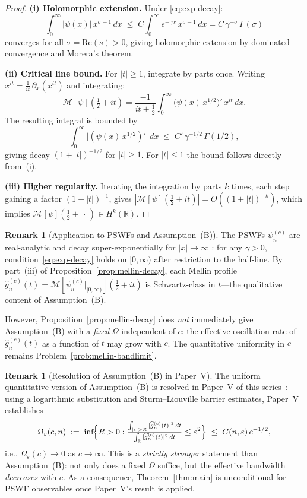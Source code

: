 \documentclass[12pt,a4paper]{amsart}
\theoremstyle{definition}
\newtheorem{remark}[theorem]{Remark}
\begin{document}
\begin{proof}
\textbf{(i) Holomorphic extension.}
Under \eqref{eq:exp-decay}:
\[
\int_0^\infty |\psi(x)|\,x^{\sigma-1}\,dx
\;\le\; C \int_0^\infty e^{-\gamma x}\,
x^{\sigma-1}\,dx
= C\,\gamma^{-\sigma}\,\Gamma(\sigma)
\]
converges for all $\sigma = \mathrm{Re}(s) > 0$,
giving holomorphic extension by dominated convergence
and Morera's theorem.

\textbf{(ii) Critical line bound.}
For $|t| \ge 1$, integrate by parts once. Writing
$x^{it} = \frac{1}{it}\,\partial_x(x^{it})$ and
integrating:
\[
\mathcal{M}[\psi]\!\left(\tfrac{1}{2}+it\right)
= \frac{-1}{it+\tfrac{1}{2}}
\int_0^\infty
\bigl(\psi(x)\,x^{1/2}\bigr)'\,x^{it}\,dx.
\]
The resulting integral is bounded by
\[
\int_0^\infty
\bigl|(\psi(x)\,x^{1/2})'\bigr|\,dx
\;\le\; C'\,\gamma^{-1/2}\,\Gamma(1/2),
\]
giving decay $(1+|t|)^{-1/2}$ for $|t| \ge 1$.
For $|t| \le 1$ the bound follows directly from~(i).

\textbf{(iii) Higher regularity.}
Iterating the integration by parts $k$ times, each
step gaining a factor $(1+|t|)^{-1}$, gives
$|\mathcal{M}[\psi](\tfrac{1}{2}+it)|
= O((1+|t|)^{-k})$,
which implies
$\mathcal{M}[\psi](\tfrac{1}{2}+\,\cdot\,)
\in H^k(\mathbb{R})$.
\end{proof}

\begin{remark}[Application to PSWFs and Assumption~(B)]
\label{rem:mellin-pswf}
The PSWFs $\psi_n^{(c)}$ are real-analytic and decay
super-exponentially for $|x| \to \infty$
\cite{Slepian1961}: for any $\gamma > 0$,
condition~\eqref{eq:exp-decay} holds on $[0,\infty)$
after restriction to the half-line. By
part~(iii) of Proposition~\ref{prop:mellin-decay},
each Mellin profile
$\widehat{g}_n^{(c)}(t)
= \mathcal{M}[\psi_n^{(c)}|_{[0,\infty)}]
(\tfrac{1}{2}+it)$
is Schwartz-class in $t$---the qualitative content of
Assumption~(B).

However, Proposition~\ref{prop:mellin-decay} does
\emph{not} immediately give Assumption~(B) with a
\emph{fixed} $\Omega$ independent of $c$: the effective
oscillation rate of $\widehat{g}_n^{(c)}(t)$ as a
function of $t$ may grow with $c$. The quantitative
uniformity in $c$ remains
Problem~\ref{prob:mellin-bandlimit}.
\end{remark}

\begin{remark}[Resolution of Assumption~(B) in Paper~V]
\label{rem:paperV-resolves-B}
The uniform quantitative version of Assumption~(B) is
resolved in Paper~V of this series~\cite{PaperV}:
using a logarithmic substitution and Sturm--Liouville
barrier estimates, Paper~V establishes
\[
\Omega_\varepsilon(c,n)
\;:=\;
\inf\!\Bigl\{R>0:\tfrac{\int_{|t|>R}|\widehat{g}_n^{(c)}(t)|^2\,dt}
{\int_\mathbb{R}|\widehat{g}_n^{(c)}(t)|^2\,dt}
\le\varepsilon^2\Bigr\}
\;\le\; C(n,\varepsilon)\,c^{-1/2},
\]
i.e., $\Omega_\varepsilon(c) \to 0$ as $c \to \infty$.
This is a \emph{strictly stronger} statement than Assumption~(B):
not only does a fixed $\Omega$ suffice, but the effective
bandwidth \emph{decreases} with $c$.
As a consequence, Theorem~\ref{thm:main} is unconditional
for PSWF observables once Paper~V's result is applied.
\end{remark}
\end{document}
